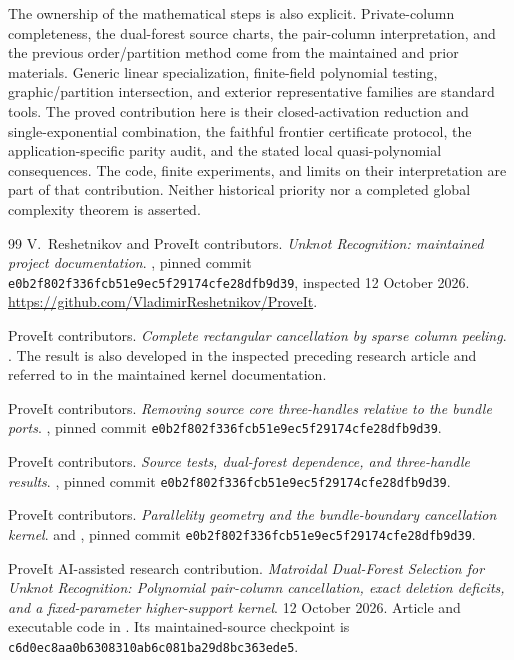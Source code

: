 \documentclass[11pt,letterpaper]{article}
\theoremstyle{definition}
\newcommand{\pin}{\texttt{e0b2f802f336fcb51e9ec5f29174cfe28dfb9d39}}
\begin{document}
The ownership of the mathematical steps is also explicit. Private-column
completeness, the dual-forest source charts, the pair-column interpretation,
and the previous order/partition method come from the maintained and prior
materials. Generic linear specialization, finite-field polynomial testing,
graphic/partition intersection, and exterior representative families are
standard tools. The proved contribution here is their closed-activation
reduction and single-exponential combination, the faithful frontier
certificate protocol, the application-specific parity audit, and the stated
local quasi-polynomial consequences. The code, finite experiments, and
limits on their interpretation are part of that contribution. Neither
historical priority nor a completed global complexity theorem is asserted.

\begin{thebibliography}{99}
V.~Reshetnikov and ProveIt contributors.
\emph{Unknot Recognition: maintained project documentation}.
, pinned commit \pin, inspected
12 October 2026.
\url{https://github.com/VladimirReshetnikov/ProveIt}.

ProveIt contributors.
\emph{Complete rectangular cancellation by sparse column peeling}.
.
The result is also developed in the inspected preceding research article
\cite{prior} and referred to in the maintained kernel documentation.

ProveIt contributors.
\emph{Removing source core three-handles relative to the bundle ports}.
,
pinned commit \pin.

ProveIt contributors.
\emph{Source tests, dual-forest dependence, and three-handle results}.
,
pinned commit \pin.

ProveIt contributors.
\emph{Parallelity geometry and the bundle-boundary cancellation kernel}.
 and
,
pinned commit \pin.

ProveIt AI-assisted research contribution.
\emph{Matroidal Dual-Forest Selection for Unknot Recognition:
Polynomial pair-column cancellation, exact deletion deficits, and a
fixed-parameter higher-support kernel}.
12 October 2026. Article and executable code in
.
Its maintained-source checkpoint is
\texttt{c6d0ec8aa0b6308310ab6c081ba29d8bc363ede5}.


\end{thebibliography}
\end{document}
